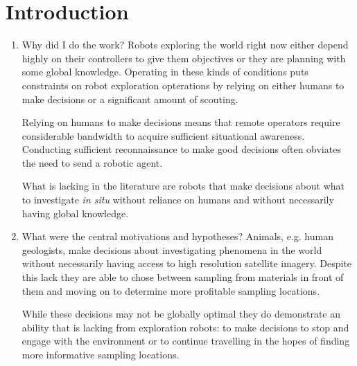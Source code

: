 \section{Introduction}
\label{sec:intro}

\begin{enumerate}
\item Why did I do the work?
	Robots exploring the world right now either depend highly on their controllers to give them objectives or they are planning with some global knowledge.  Operating in these kinds of conditions puts constraints on robot exploration opterations by relying on either humans to make decisions or a significant amount of scouting.

	Relying on humans to make decisions means that remote operators require considerable bandwidth to acquire sufficient situational awareness.  Conducting sufficient reconnaissance to make good decisions often obviates the need to send a robotic agent.

	What is lacking in the literature are robots that make decisions about what to investigate \emph{in situ} without reliance on humans and without necessarily having global knowledge.
	\item What were the central motivations and hypotheses?
	Animals, e.g. human geologists, make decisions about investigating phenomena in the world without necessarily having access to high resolution satellite imagery.  Despite this lack they are able to chose between sampling from materials in front of them and moving on to determine more profitable sampling locations.

	While these decisions may not be globally optimal they do demonstrate an ability that is lacking from exploration robots: to make decisions to stop and engage with the environment or to continue travelling in the hopes of finding more informative sampling locations.
	\end{enumerate}



